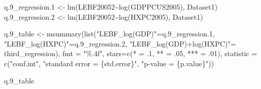 \documentclass[
]{article}
\newenvironment{Shaded}{\begin{snugshade}}{\end{snugshade}}
\newcommand{\AttributeTok}[1]{\textcolor[rgb]{0.77,0.63,0.00}{#1}}
\newcommand{\DecValTok}[1]{\textcolor[rgb]{0.00,0.00,0.81}{#1}}
\newcommand{\FloatTok}[1]{\textcolor[rgb]{0.00,0.00,0.81}{#1}}
\newcommand{\FunctionTok}[1]{\textcolor[rgb]{0.00,0.00,0.00}{#1}}
\newcommand{\NormalTok}[1]{#1}
\newcommand{\OtherTok}[1]{\textcolor[rgb]{0.56,0.35,0.01}{#1}}
\newcommand{\SpecialCharTok}[1]{\textcolor[rgb]{0.00,0.00,0.00}{#1}}
\newcommand{\StringTok}[1]{\textcolor[rgb]{0.31,0.60,0.02}{#1}}
\begin{document}
\begin{Shaded}
\begin{Highlighting}[]
\NormalTok{q}\FloatTok{.9}\NormalTok{\_regression}\FloatTok{.1} \OtherTok{\textless{}{-}} \FunctionTok{lm}\NormalTok{(LEBF20052}\SpecialCharTok{\textasciitilde{}}\FunctionTok{log}\NormalTok{(GDPPCUS2005), Dataset1)}
\NormalTok{q}\FloatTok{.9}\NormalTok{\_regression}\FloatTok{.2} \OtherTok{\textless{}{-}} \FunctionTok{lm}\NormalTok{(LEBF20052}\SpecialCharTok{\textasciitilde{}}\FunctionTok{log}\NormalTok{(HXPC2005), Dataset1)}

\NormalTok{q}\FloatTok{.9}\NormalTok{\_table }\OtherTok{\textless{}{-}} \FunctionTok{msummary}\NormalTok{(}\FunctionTok{list}\NormalTok{(}\StringTok{"LEBF\_log(GDP)"}\OtherTok{=}\NormalTok{q}\FloatTok{.9}\NormalTok{\_regression}\FloatTok{.1}\NormalTok{, }\StringTok{"LEBF\_log(HXPC)"}\OtherTok{=}\NormalTok{q}\FloatTok{.9}\NormalTok{\_regression}\FloatTok{.2}\NormalTok{,}
                           \StringTok{"LEBF\_log(GDP)+log(HXPC)"}\OtherTok{=}\NormalTok{ third\_regression), }\AttributeTok{fmt =} \StringTok{"\%.4f"}\NormalTok{,}
                      \AttributeTok{stars=}\FunctionTok{c}\NormalTok{(}\StringTok{\textquotesingle{}*\textquotesingle{}} \OtherTok{=}\NormalTok{ .}\DecValTok{1}\NormalTok{, }\StringTok{\textquotesingle{}**\textquotesingle{}} \OtherTok{=}\NormalTok{ .}\DecValTok{05}\NormalTok{, }\StringTok{\textquotesingle{}***\textquotesingle{}} \OtherTok{=}\NormalTok{ .}\DecValTok{01}\NormalTok{),  }
                      \AttributeTok{statistic =} \FunctionTok{c}\NormalTok{(}\StringTok{"conf.int"}\NormalTok{, }\StringTok{"standard error = \{std.error\}"}\NormalTok{, }
                                            \StringTok{"p{-}value = \{p.value\}"}\NormalTok{))  }

\NormalTok{q}\FloatTok{.9}\NormalTok{\_table}
\end{Highlighting}
\end{Shaded}
\end{document}
